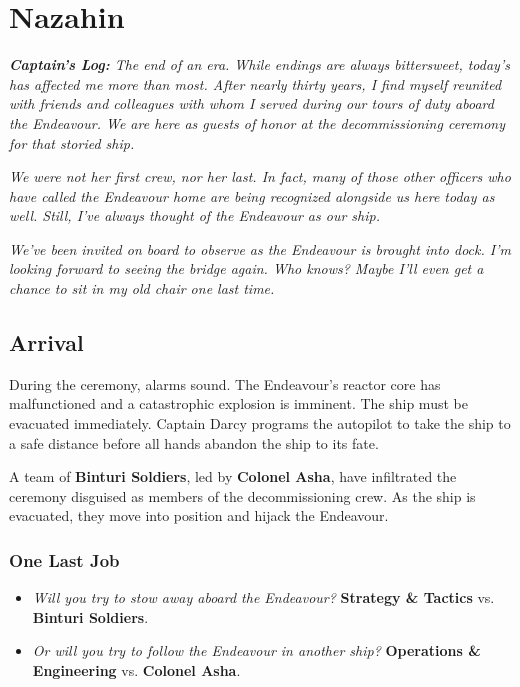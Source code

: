 \documentclass[11pt, a5paper, parskip=half-, DIV=12]{scrartcl}
\begin{document}
\section*{Nazahin}
\textit{\textbf{Captain's Log:} The end of an era. While endings are always bittersweet, today's has affected me more than most. After nearly thirty years, I find myself reunited with friends and colleagues with whom I served during our tours of duty aboard the Endeavour. We are here as guests of honor at the decommissioning ceremony for that storied ship.} 

\textit{We were not her first crew, nor her last. In fact, many of those other officers who have called the Endeavour home are being recognized alongside us here today as well. Still, I've always thought of the Endeavour as our ship.}

\textit{We've been invited on board to observe as the Endeavour is brought into dock. I'm looking forward to seeing the bridge again. Who knows? Maybe I'll even get a chance to sit in my old chair one last time.}


\subsection*{Arrival}
During the ceremony, alarms sound. The Endeavour's reactor core has malfunctioned and a catastrophic explosion is imminent. The ship must be evacuated immediately. Captain Darcy programs the autopilot to take the ship to a safe distance before all hands abandon the ship to its fate.

A team of \textbf{Binturi Soldiers}, led by \textbf{Colonel Asha}, have infiltrated the ceremony disguised as members of the decommissioning crew. As the ship is evacuated, they move into position and hijack the Endeavour.

\subsubsection*{One Last Job}
\begin{itemize}
	\item \textit{Will you try to stow away aboard the Endeavour?} \textbf{Strategy \& Tactics} vs. \textbf{Binturi Soldiers}.
	\item \textit{Or will you try to follow the Endeavour in another ship?} \textbf{Operations \& Engineering} vs. \textbf{Colonel Asha}.
\end{itemize}

\newpage
\end{document}
